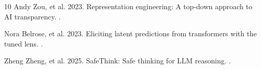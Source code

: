 \documentclass[11pt]{article}
\begin{document}
\begin{thebibliography}{10}
Andy Zou, et al. 2023.
\newblock Representation engineering: A top-down approach to AI transparency.
.

Nora Belrose, et al. 2023.
\newblock Eliciting latent predictions from transformers with the tuned lens.
.

Zheng Zheng, et al. 2025.
\newblock SafeThink: Safe thinking for LLM reasoning.
.

\end{thebibliography}
\end{document}
